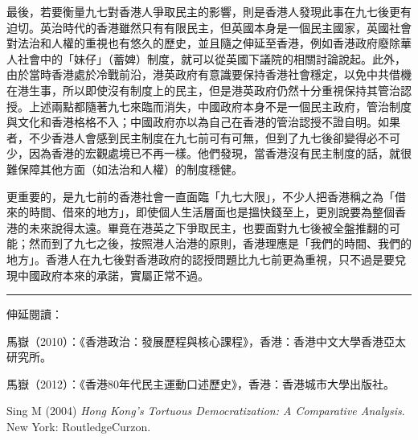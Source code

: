 最後，若要衡量九七對香港人爭取民主的影響，則是香港人發現此事在九七後更有迫切。英治時代的香港雖然只有有限民主，但英國本身是一個民主國家，英國社會對法治和人權的重視也有悠久的歷史，並且隨之伸延至香港，例如香港政府廢除華人社會中的「妹仔」（蓄婢）制度，就可以從英國下議院的相關討論說起。此外，由於當時香港處於冷戰前沿，港英政府有意識要保持香港社會穩定，以免中共借機在港生事，所以即使沒有制度上的民主，但是港英政府仍然十分重視保持其管治認授。上述兩點都隨著九七來臨而消失，中國政府本身不是一個民主政府，管治制度與文化和香港格格不入；中國政府亦以為自己在香港的管治認授不證自明。如果者，不少香港人會感到民主制度在九七前可有可無，但到了九七後卻變得必不可少，因為香港的宏觀處境已不再一樣。他們發現，當香港沒有民主制度的話，就很難保障其他方面（如法治和人權）的制度穩健。

更重要的，是九七前的香港社會一直面臨「九七大限」，不少人把香港稱之為「借來的時間、借來的地方」，即使個人生活層面也是搵快錢至上，更別說要為整個香港的未來說得太遠。畢竟在港英之下爭取民主，也要面對九七後被全盤推翻的可能；然而到了九七之後，按照港人治港的原則，香港理應是「我們的時間、我們的地方」。香港人在九七後對香港政府的認授問題比九七前更為重視，只不過是要兌現中國政府本來的承諾，實屬正常不過。

\rule[-10pt]{15cm}{0.05em}

伸延閱讀：

馬嶽（2010）：《香港政治：發展歷程與核心課程》，香港：香港中文大學香港亞太研究所。

馬嶽（2012）：《香港80年代民主運動口述歷史》，香港：香港城市大學出版社。

Sing M (2004) \textit{Hong Kong’s Tortuous Democratization: A Comparative Analysis}. New York: RoutledgeCurzon.

